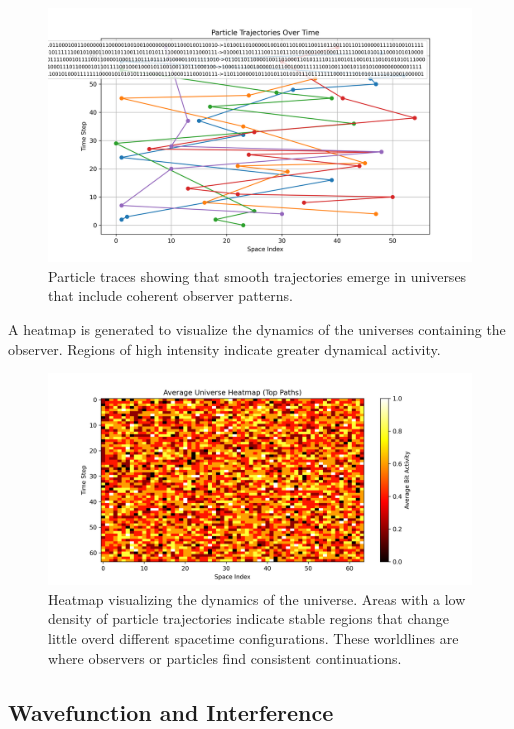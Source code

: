 \documentclass[12pt]{article}
\begin{document}
\begin{figure}[h!]
    \centering
    \includegraphics[width=1.0\textwidth]{figures/particle_trajectories.png}
    \caption{Particle traces showing that smooth trajectories emerge in universes that include coherent observer patterns.}
    \label{fig:particle_trajectories}
\end{figure}

A heatmap is generated to visualize the dynamics of the universes containing the observer. Regions of high intensity indicate greater dynamical activity.

\begin{figure}[h!]
    \centering
    \includegraphics[width=1.0\textwidth]{figures/average_universe_heatmap.png}
    \caption{Heatmap visualizing the dynamics of the universe. Areas with a low density of particle trajectories indicate stable regions that change little overd different spacetime configurations. These worldlines are where observers or particles find consistent continuations.}
    \label{fig:average_universe_heatmap}
\end{figure}

\subsection{Wavefunction and Interference}
\end{document}
